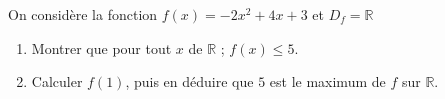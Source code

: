 \begin{Application}[][10 min]
On considère la fonction $f(x) = -2x^2 + 4x + 3$ et $D_f = \mathbb{R}$
\begin{enumerate}
    \item Montrer que pour tout $x$ de $\mathbb{R}$ ; $f(x) \leq 5$.
    \item Calculer $f(1)$, puis en déduire que $5$ est le maximum de $f$ sur $\mathbb{R}$.
\end{enumerate}
\end{Application}
